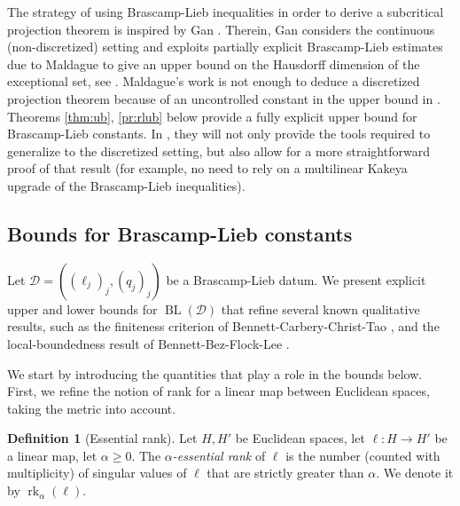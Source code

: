 \documentclass[a4paper,english]{amsart}
\theoremstyle{definition}
\newtheorem*{definition}{Definition}
\newcommand{\comW}[1]{\marginpar{{\color{blue} #1}}}
\newcommand{\1}{\mathbbm{1}}
\newcommand{\sD} {{\mathscr D}}
\DeclareMathOperator{\rk}{rk}
\DeclareMathOperator{\BL}{BL}
\begin{document}
The strategy of using Brascamp-Lieb inequalities in order to derive a subcritical projection theorem is inspired by Gan \cite{Gan24}.
Therein, Gan considers the continuous (non-discretized) setting and exploits  partially explicit Brascamp-Lieb estimates due to Maldague \cite{Maldague22} to give an upper bound on the Hausdorff dimension of the exceptional set, see \cite[Theorem 1]{Gan24}.
Maldague's work  \cite{Maldague22} is not enough to deduce a discretized projection theorem because of an uncontrolled constant in the upper bound in \cite[Theorem 1.1]{Maldague22}.
Theorems \ref{thm:ub}, \ref{pr:rlub}  below provide a fully explicit upper bound for Brascamp-Lieb constants.
In \cite{BH25-walks}, they will not only provide the tools required to generalize \cite[Theorem 1]{Gan24} to the discretized setting, but also allow for a  more straightforward proof of that result (for example, no need to rely on a multilinear Kakeya upgrade of the Brascamp-Lieb inequalities).

\bigskip

\subsection{Bounds for Brascamp-Lieb constants} \label{Sec-bnd-BL1}
Let  $\sD=((\ell_{j})_{j}, (q_{j})_{j})$ be a Brascamp-Lieb datum.
We  present explicit upper and lower bounds for $\BL(\sD)$ that  refine several known qualitative results, such as the finiteness criterion of Bennett-Carbery-Christ-Tao \cite{BCCT08, BCCT10}, and the local-boundedness result of  Bennett-Bez-Flock-Lee \cite{BBFL18}.

\bigskip

We start by introducing the quantities that play a role in the bounds below.
First, we refine the notion of  rank for  a linear map between Euclidean spaces, taking the metric into account.
\begin{definition}[Essential rank]\label{def-ess-rank}
Let $H,H'$ be Euclidean spaces, let $\ell:H\rightarrow H'$ be a linear map, let $\alpha \geq 0$.
The  \emph{$\alpha$-essential rank} of $\ell$ is the number (counted with multiplicity) of  singular values of $\ell$ that are strictly greater than $\alpha$. We denote it by $\rk_\alpha(\ell)$.
\end{definition}
\end{document}
